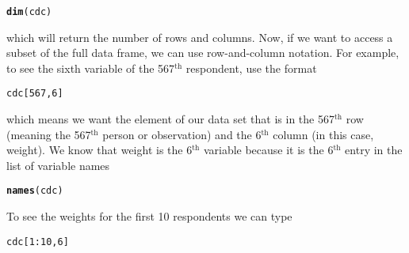 \documentclass{article}\usepackage[]{graphicx}\usepackage[]{color}
\makeatletter
\newcommand{\hlnum}[1]{\textcolor[rgb]{0.686,0.059,0.569}{#1}}%
\newcommand{\hlopt}[1]{\textcolor[rgb]{0,0,0}{#1}}%
\newcommand{\hlstd}[1]{\textcolor[rgb]{0.345,0.345,0.345}{#1}}%
\newcommand{\hlkwd}[1]{\textcolor[rgb]{0.737,0.353,0.396}{\textbf{#1}}}%
\newenvironment{kframe}{%
 \def\at@end@of@kframe{}%
 \ifinner\ifhmode%
  \def\at@end@of@kframe{\end{minipage}}%
  \begin{minipage}{\columnwidth}%
 \fi\fi%
 \def\FrameCommand##1{\hskip\@totalleftmargin \hskip-\fboxsep
 \colorbox{shadecolor}{##1}\hskip-\fboxsep
     \hskip-\linewidth \hskip-\@totalleftmargin \hskip\columnwidth}%
 \MakeFramed {\advance\hsize-\width
   \@totalleftmargin\z@ \linewidth\hsize
   \@setminipage}}%
 {\par\unskip\endMakeFramed%
 \at@end@of@kframe}
\newenvironment{knitrout}{}{} %
\makeatother
\begin{document}
\begin{knitrout}
\color{fgcolor}\begin{kframe}
\begin{alltt}
\hlkwd{dim}\hlstd{(cdc)}
\end{alltt}
\end{kframe}
\end{knitrout}

which will return the number of rows and columns. Now, if we want to access a subset of the full data frame, we can use row-and-column notation. For example, to see the sixth variable of the 567$^{\textrm{th}}$ respondent, use the format

\begin{knitrout}
\color{fgcolor}\begin{kframe}
\begin{alltt}
\hlstd{cdc[}\hlnum{567}\hlstd{,}\hlnum{6}\hlstd{]}
\end{alltt}
\end{kframe}
\end{knitrout}

which means we want the element of our data set that is in the 567$^{\textrm{th}}$ row (meaning the 567$^{\textrm{th}}$ person or observation) and the 6$^{\textrm{th}}$ column (in this case, weight). We know that \hlstd{weight} is the 6$^{\textrm{th}}$ variable because it is the 6$^{\textrm{th}}$ entry in the list of variable names

\begin{knitrout}
\color{fgcolor}\begin{kframe}
\begin{alltt}
\hlkwd{names}\hlstd{(cdc)}
\end{alltt}
\end{kframe}
\end{knitrout}

To see the weights for the first 10 respondents we can type

\begin{knitrout}
\color{fgcolor}\begin{kframe}
\begin{alltt}
\hlstd{cdc[}\hlnum{1}\hlopt{:}\hlnum{10}\hlstd{,}\hlnum{6}\hlstd{]}
\end{alltt}
\end{kframe}
\end{knitrout}
\end{document}
